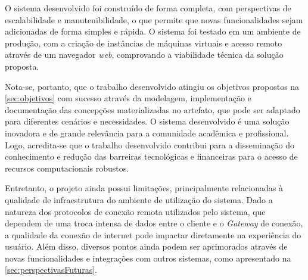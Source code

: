 O sistema desenvolvido foi construído de forma completa, com perspectivas de escalabilidade e manutenibilidade, o que permite que novas funcionalidades sejam adicionadas de forma simples e rápida. O sistema foi testado em um ambiente de produção, com a criação de instâncias de máquinas virtuais e acesso remoto através de um navegador \textit{web}, comprovando a viabilidade técnica da solução proposta.

Nota-se, portanto, que o trabalho desenvolvido atingiu os objetivos propostos na \autoref{sec:objetivos} com sucesso através da modelagem, implementação e documentação das concepções materializadas no artefato, que pode ser adaptado para diferentes cenários e necessidades. O sistema desenvolvido é uma solução inovadora e de grande relevância para a comunidade acadêmica e profissional. Logo, acredita-se que o trabalho desenvolvido contribui para a disseminação do conhecimento e redução das barreiras tecnológicas e financeiras para o acesso de recursos computacionais robustos. 

Entretanto, o projeto ainda possui limitações, principalmente relacionadas à qualidade de infraestrutura do ambiente de utilização do sistema. Dado a natureza dos protocolos de conexão remota utilizados pelo sistema, que dependem de uma troca intensa de dados entre o cliente e o \textit{Gateway} de conexão, a qualidade da conexão de internet pode impactar diretamente na experiência do usuário. Além disso, diversos pontos ainda podem ser aprimorados através de novas funcionalidades e integrações com outros sistemas, como apresentado na \autoref{sec:perspectivasFuturas}.








